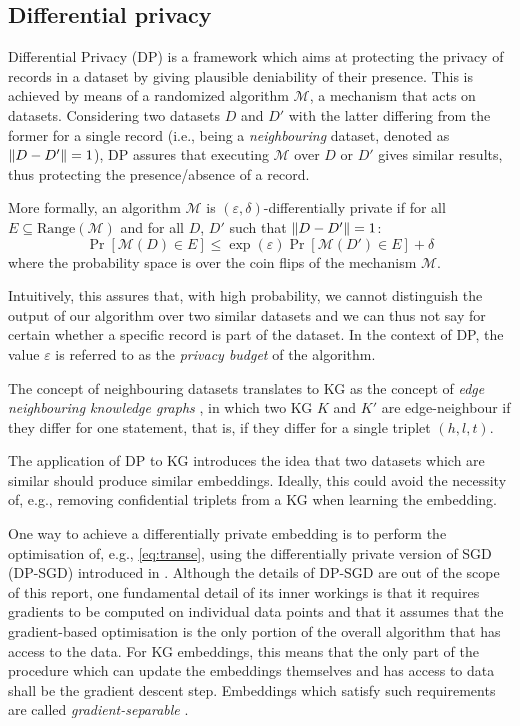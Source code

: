\subsection{Differential privacy}\label{sec:dp}

Differential Privacy (DP) \parencite{dwork2008differential, dwork2014algorithmic} is a framework which aims at protecting the privacy of records in a dataset by giving plausible deniability of their presence.
This is achieved by means of a randomized algorithm $\mathcal{M}$, a mechanism that acts on datasets.
Considering two datasets $D$ and $D'$ with the latter differing from the former for a single record (i.e., being a \emph{neighbouring} dataset, denoted as $\left\lVert D - D'\right\rVert = 1$), DP assures that executing $\mathcal{M}$ over $D$ or $D'$ gives similar results, thus protecting the presence/absence of a record.

More formally, an algorithm $\mathcal{M}$ is $(\varepsilon, \delta)$-differentially private if for all $E \subseteq \text{Range}(\mathcal{M})$ and for all $D$, $D'$ such that $\left\lVert D - D'\right\rVert = 1$:
$$ \Pr[\mathcal{M}(D) \in E] \le \exp{(\varepsilon)}\Pr[\mathcal{M}(D') \in E] + \delta$$
where the probability space is over the coin flips of the mechanism $\mathcal{M}$.

Intuitively, this assures that, with high probability, we cannot distinguish the output of our algorithm over two similar datasets and we can thus not say for certain whether a specific record is part of the dataset.
In the context of DP, the value $\varepsilon$ is referred to as the \emph{privacy budget} of the algorithm.

The concept of neighbouring datasets translates to KG  as the concept of \emph{edge neighbouring knowledge graphs} \parencite{han2022framework}, in which two KG $K$ and $K'$ are edge-neighbour if they differ for one statement, that is, if they differ for a single triplet $(h, l, t)$.

The application of DP to KG introduces the idea that two datasets which are similar should produce similar embeddings.
Ideally, this could avoid the necessity of, e.g., removing confidential triplets from a KG when learning the embedding.

One way to achieve a differentially private embedding is to perform the optimisation of, e.g., \cref{eq:transe}, using the differentially private version of SGD (DP-SGD) introduced in \cite{abadi2016deep}.
Although the details of DP-SGD are out of the scope of this report, one fundamental detail of its inner workings is that it requires gradients to be computed on individual data points and that it assumes that the gradient-based optimisation is the only portion of the overall algorithm that has access to the data.
For KG embeddings, this means that the only part of the procedure which can update the embeddings themselves and has access to data shall be the gradient descent step. 
Embeddings which satisfy such requirements are called \emph{gradient-separable} \parencite{han2022framework}.


